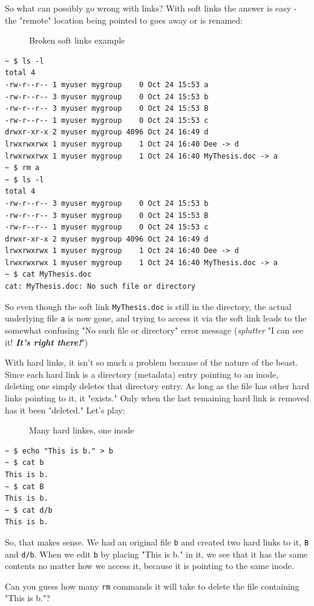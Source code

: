 \documentclass[10pt,]{book}
\numberwithin{figure}{chapter}
\DeclareRobustCommand{\drcap}[1]{\begin{figure}[H]\caption{#1}\end{figure}}
\begin{document}
So what can possibly go wrong with links? With soft links the answer is
easy - the "remote" location being pointed to goes away or is renamed:

\drcap{Broken soft links example}

\begin{verbatim}
~ $ ls -l
total 4
-rw-r--r-- 1 myuser mygroup    0 Oct 24 15:53 a
-rw-r--r-- 3 myuser mygroup    0 Oct 24 15:53 b
-rw-r--r-- 3 myuser mygroup    0 Oct 24 15:53 B
-rw-r--r-- 1 myuser mygroup    0 Oct 24 15:53 c
drwxr-xr-x 2 myuser mygroup 4096 Oct 24 16:49 d
lrwxrwxrwx 1 myuser mygroup    1 Oct 24 16:40 Dee -> d
lrwxrwxrwx 1 myuser mygroup    1 Oct 24 16:40 MyThesis.doc -> a
~ $ rm a
~ $ ls -l
total 4
-rw-r--r-- 3 myuser mygroup    0 Oct 24 15:53 b
-rw-r--r-- 3 myuser mygroup    0 Oct 24 15:53 B
-rw-r--r-- 1 myuser mygroup    0 Oct 24 15:53 c
drwxr-xr-x 2 myuser mygroup 4096 Oct 24 16:49 d
lrwxrwxrwx 1 myuser mygroup    1 Oct 24 16:40 Dee -> d
lrwxrwxrwx 1 myuser mygroup    1 Oct 24 16:40 MyThesis.doc -> a
~ $ cat MyThesis.doc 
cat: MyThesis.doc: No such file or directory
\end{verbatim}

So even though the soft link \texttt{MyThesis.doc} is still in the
directory, the actual underlying file \texttt{a} is now gone, and trying
to access it via the soft link leads to the somewhat confusing "No such
file or directory" error message (\emph{splutter} "I can see it!
\textbf{\emph{It's right there!}}")

With hard links, it isn't so much a problem because of the nature of the
beast. Since each hard link is a directory (metadata) entry pointing to
an inode, deleting one simply deletes that directory entry. As long as
the file has other hard links pointing to it, it "exists." Only when the
last remaining hard link is removed has it been "deleted." Let's play:

\drcap{Many hard linkes, one inode}

\begin{verbatim}
~ $ echo "This is b." > b
~ $ cat b
This is b.
~ $ cat B
This is b.
~ $ cat d/b
This is b.
\end{verbatim}

So, that makes sense. We had an original file \texttt{b} and created two
hard links to it, \texttt{B} and \texttt{d/b}. When we edit \texttt{b}
by placing "This is b." in it, we see that it has the same contents no
matter how we access it, because it is pointing to the same inode.

Can you guess how many \texttt{rm} commands it will take to delete the
file containing "This is b."?
\end{document}

